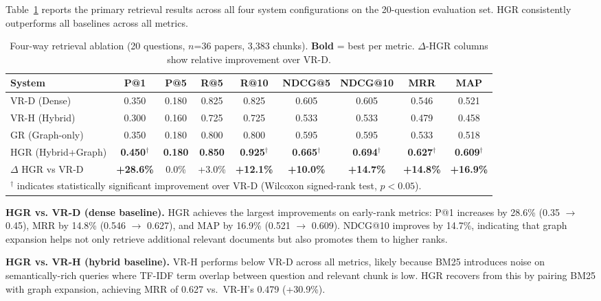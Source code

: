 \documentclass[journal]{IEEEtran}
\begin{document}
Table~\ref{tab:retrieval} reports the primary retrieval results
across all four system configurations on the 20-question evaluation
set. HGR consistently outperforms all baselines across all metrics.

\begin{table}[!t]
\caption{Four-way retrieval ablation (20 questions, $n$=36 papers,
         3,383 chunks). \textbf{Bold} = best per metric.
         $\Delta$-HGR columns show relative improvement over VR-D.}
\label{tab:retrieval}
\centering
\setlength{\tabcolsep}{6pt}
\begin{tabular}{lccccccc@{\quad}c}
\toprule
\textbf{System}
  & \textbf{P@1} & \textbf{P@5} & \textbf{R@5} & \textbf{R@10}
  & \textbf{NDCG@5} & \textbf{NDCG@10}
  & \textbf{MRR} & \textbf{MAP} \\
\midrule
VR-D (Dense)         & 0.350 & 0.180 & 0.825 & 0.825 & 0.605 & 0.605 & 0.546 & 0.521 \\
VR-H (Hybrid)        & 0.300 & 0.160 & 0.725 & 0.725 & 0.533 & 0.533 & 0.479 & 0.458 \\
GR (Graph-only)      & 0.350 & 0.180 & 0.800 & 0.800 & 0.595 & 0.595 & 0.533 & 0.518 \\
HGR (Hybrid+Graph)   & \textbf{0.450}$^\dagger$ & \textbf{0.180} & \textbf{0.850} & \textbf{0.925}$^\dagger$ & \textbf{0.665}$^\dagger$ & \textbf{0.694}$^\dagger$ & \textbf{0.627}$^\dagger$ & \textbf{0.609}$^\dagger$ \\
\midrule
$\Delta$ HGR vs VR-D & \textbf{+28.6\%} & 0.0\% & +3.0\% & \textbf{+12.1\%} & \textbf{+10.0\%} & \textbf{+14.7\%} & \textbf{+14.8\%} & \textbf{+16.9\%} \\
\bottomrule
\multicolumn{9}{l}{\small $^\dagger$ indicates statistically significant improvement over VR-D (Wilcoxon signed-rank test, $p < 0.05$).}
\end{tabular}
\end{table}

\textbf{HGR vs. VR-D (dense baseline).}
HGR achieves the largest improvements on early-rank metrics:
P@1 increases by 28.6\% (0.35 $\rightarrow$ 0.45),
MRR by 14.8\% (0.546 $\rightarrow$ 0.627),
and MAP by 16.9\% (0.521 $\rightarrow$ 0.609).
NDCG@10 improves by 14.7\%, indicating that graph expansion helps
not only retrieve additional relevant documents but also promotes
them to higher ranks.

\textbf{HGR vs. VR-H (hybrid baseline).}
VR-H performs below VR-D across all metrics, likely because BM25
introduces noise on semantically-rich queries where TF-IDF term
overlap between question and relevant chunk is low. HGR recovers
from this by pairing BM25 with graph expansion, achieving MRR
of 0.627 vs.\ VR-H's 0.479 (+30.9\%).
\end{document}
